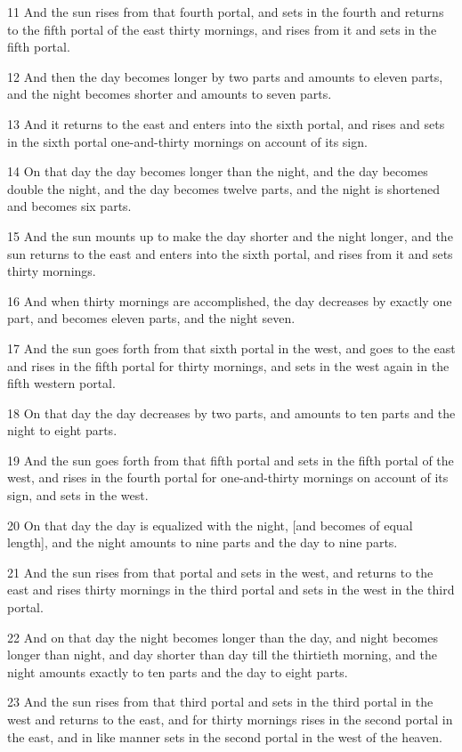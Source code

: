 \par 11 And the sun rises from that fourth portal, and sets in the fourth and returns to the fifth portal of the east thirty mornings, and rises from it and sets in the fifth portal.
\par 12 And then the day becomes longer by two parts and amounts to eleven parts, and the night becomes shorter and amounts to seven parts.
\par 13 And it returns to the east and enters into the sixth portal, and rises and sets in the sixth portal one-and-thirty mornings on account of its sign.
\par 14 On that day the day becomes longer than the night, and the day becomes double the night, and the day becomes twelve parts, and the night is shortened and becomes six parts.
\par 15 And the sun mounts up to make the day shorter and the night longer, and the sun returns to the east and enters into the sixth portal, and rises from it and sets thirty mornings.
\par 16 And when thirty mornings are accomplished, the day decreases by exactly one part, and becomes eleven parts, and the night seven.
\par 17 And the sun goes forth from that sixth portal in the west, and goes to the east and rises in the fifth portal for thirty mornings, and sets in the west again in the fifth western portal.
\par 18 On that day the day decreases by two parts, and amounts to ten parts and the night to eight parts.
\par 19 And the sun goes forth from that fifth portal and sets in the fifth portal of the west, and rises in the fourth portal for one-and-thirty mornings on account of its sign, and sets in the west.
\par 20 On that day the day is equalized with the night, [and becomes of equal length], and the night amounts to nine parts and the day to nine parts.
\par 21 And the sun rises from that portal and sets in the west, and returns to the east and rises thirty mornings in the third portal and sets in the west in the third portal.
\par 22 And on that day the night becomes longer than the day, and night becomes longer than night, and day shorter than day till the thirtieth morning, and the night amounts exactly to ten parts and the day to eight parts.
\par 23 And the sun rises from that third portal and sets in the third portal in the west and returns to the east, and for thirty mornings rises in the second portal in the east, and in like manner sets in the second portal in the west of the heaven.
